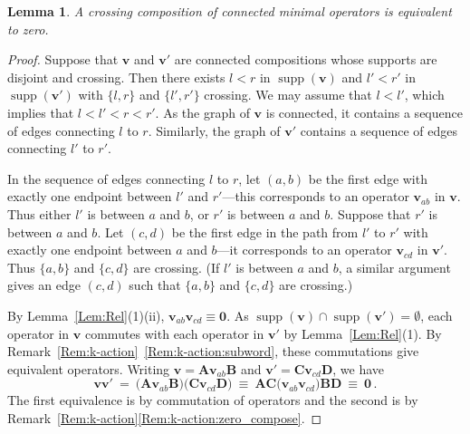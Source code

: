 \documentclass[12pt,oneside,reqno]{amsart}
\newtheorem{lemma}[theorem]{Lemma}
\theoremstyle{definition}
\numberwithin{equation}{section}
\newcommand{\qv}{{\mathbf v}}
\newcommand{\bzero}{{\mathbf 0}}
\DeclareMathOperator{\supp}{supp}
\begin{document}
\begin{lemma}
    \label{L:crossing-supports}
    A crossing composition of connected minimal operators is equivalent to zero.
\end{lemma}
\begin{proof}
  Suppose that $\qv$ and $\qv'$ are connected compositions whose supports are disjoint and crossing.
  Then there exists $l<r$ in $\supp(\qv)$ and $l'<r'$ in $\supp(\qv')$ with
  $\{l,r\}$ and $\{l',r'\}$ crossing.
  We may assume that $l < l'$, which implies that  $l < l' < r < r'$.
  As the graph of $\qv$ is connected, it contains a sequence of edges connecting $l$ to $r$.
  Similarly, the graph of $\qv'$  contains a sequence of edges connecting $l'$ to $r'$.

  In the sequence of edges connecting $l$ to $r$, let $(a,b)$ be the first edge with exactly one endpoint between $l'$ and $r'$---this
  corresponds to an operator $\qv_{ab}$ in $\qv$.
  Thus either $l'$ is between $a$ and $b$, or $r'$  is between $a$ and $b$.
  Suppose that $r'$ is between $a$ and $b$.
  Let $(c,d)$ be the first edge in the path from $l'$ to $r'$ with exactly one endpoint between $a$ and $b$---it corresponds to an operator
  $\qv_{cd}$ in $\qv'$.
  Thus $\{a,b\}$ and $\{c,d\}$ are crossing.
  (If  $l'$ is between $a$ and $b$, a similar argument gives an edge $(c,d)$ such that  $\{a,b\}$ and $\{c,d\}$ are crossing.)
  
   By Lemma~\ref{Lem:Rel}(1)(ii), $\qv_{ab} \qv_{cd} \equiv\bzero$.
   As $\supp(\qv)\cap \supp(\qv')=\emptyset$, each operator in $\qv$ commutes with each operator in $\qv'$ by
   Lemma~\ref{Lem:Rel}(1).
   By Remark~\ref{Rem:k-action}~\ref{Rem:k-action:subword}, these commutations give equivalent operators.
   Writing $\qv=\mathbf{A} \qv_{ab} \mathbf{B}$ and $\qv'=\mathbf{C}  \qv_{cd}  \mathbf{D}$, we have
    \begin{equation*}
        \qv \qv'
        \ =\  \big(\mathbf{A} \qv_{ab} \mathbf{B}
          \big)
          \big(\mathbf{C}  \qv_{cd}  \mathbf{D}
          \big)
       \  \equiv\  \mathbf{AC} \big(\qv_{ab} \qv_{cd}\big)\mathbf{BD}\  \equiv\  \bzero\,.
    \end{equation*}
   The first equivalence is by commutation of operators and the second is by Remark~\ref{Rem:k-action}\ref{Rem:k-action:zero_compose}.
\end{proof}
\end{document}
